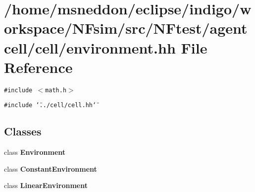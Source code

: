 \section{/home/msneddon/eclipse/indigo/workspace/NFsim/src/NFtest/agentcell/cell/environment.hh File Reference}
\label{environment_8hh}


{\tt \#include $<$math.h$>$}\par
{\tt \#include \char`\"{}../cell/cell.hh\char`\"{}}\par
\subsection*{Classes}
\begin{CompactItemize}
\item 
class {\bf Environment}
\item 
class {\bf ConstantEnvironment}
\item 
class {\bf LinearEnvironment}
\end{CompactItemize}

